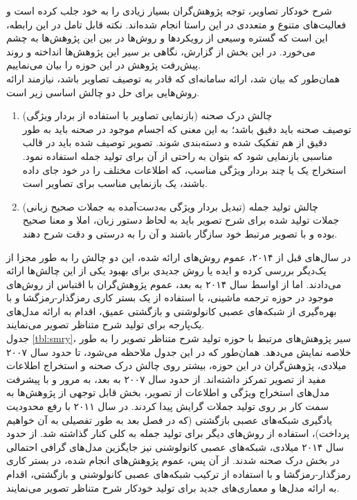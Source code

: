 شرح خودکار تصاویر، توجه پژوهش‌گران بسیار زیادی را به خود جلب کرده است و فعالیت‌های متنوع و متعددی در این راستا انجام شده‌اند. نکته قابل تامل در این رابطه، این است که گستره وسیعی از رویکردها و روش‌ها در بین این پژوهش‌ها به چشم می‌خورد. در این بخش از گزارش، نگاهی بر سیر این پژوهش‌ها انداخته و روند پیش‌رفت پژوهش‌ در این حوزه را بیان می‌نماییم.
\\
همان‌طور که بیان شد، ارائه سامانه‌ای که قادر به توصیف تصاویر باشد، نیازمند ارائه روش‌هایی برای حل دو چالش اساسی زیر است.
\begin{enumerate}
	\item چالش درک صحنه 
	(بازنمایی تصاویر با استفاده از بردار ویژگی) \\
	توصیف صحنه باید دقیق باشد؛ به این معنی که اجسام موجود در صحنه باید به طور دقیق از هم تفکیک شده و دسته‌بندی شوند. تصویر توصیف شده باید در قالب مناسبی بازنمایی شود که بتوان به راحتی از آن برای تولید جمله استفاده نمود. استخراج یک یا چند بردار ویژگی مناسب، که اطلاعات مختلف را در خود جای داده‌ باشند، یک بازنمایی مناسب برای تصاویر است.
	\item چالش تولید جمله
	(تبدیل بردار ويژگی به‌دست‌آمده به جملات صحیح زبانی)
	\\
	جملات تولید شده برای شرح تصویر باید به لحاظ دستور زبان، املا و معنا صحیح بوده و با تصویر مرتبط خود سازگار باشند و آن را به درستی و دقت شرح دهند.
\end{enumerate}

در سال‌های قبل از ۲۰۱۴، عموم روش‌های ارائه شده، این دو چالش را به طور مجزا از یک‌دیگر بررسی کرده و ایده یا روش جدیدی برای بهبود یکی از این چالش‌ها ارائه می‌دادند. اما از اواسط سال ۲۰۱۴ به بعد، عموم پژوهش‌گران با اقتباس از روش‌های موجود در حوزه ترجمه ماشینی، با استفاده از یک بستر کاری رمزگذار-رمزگشا و با بهره‌گیری از شبکه‌های عصبی کانولوشنی و بازگشتی عمیق، اقدام به ارائه مدل‌های یک‌پارجه برای تولید شرح متناظر تصویر می‌نمایند.
\\
جدول \ref{tbl:smry}، سیر پژوهش‌های مرتبط با حوزه تولید شرح متناظر تصویر را به طور خلاصه نمایش می‌دهد. همان‌طور که در این جدول ملاحظه می‌شود، تا حدود سال ۲۰۰۷ میلادی، پژوهش‌گران در این حوزه، بیشتر روی چالش درک صحنه و استخراج اطلاعات مفید از تصویر تمرکز داشته‌اند. از حدود سال ۲۰۰۷ به بعد، به مرور و با پیشرفت مدل‌های استخراج ویژگی و اطلاعات از تصویر، بخش قابل توجهی از پژوهش‌ها به سمت کار بر روی تولید جملات گرایش پیدا کردند. در سال ۲۰۱۱ با رفع محدودیت یادگیری شبکه‌های عصبی بازگشتی (که در فصل بعد به طور تفصیلی به آن خواهیم پرداخت)، استفاده از روش‌های دیگر برای تولید جمله به کلی کنار گذاشته شد. از حدود سال ۲۰۱۴ میلادی، شبکه‌های عصبی کانولوشنی نیز جایگزین مدل‌های گرافی احتمالی در بخش درک صحنه شدند. از آن پس، عموم پژوهش‌های انجام‌ شده، در بستر کاری رمزگذار-رمزگشا و با استفاده از ترکیب شبکه‌های عصبی کانولوشنی و بازگشتی، اقدام به ارائه مدل‌ها و معماری‌های جدید برای تولید خودکار شرح متناظر تصویر می‌نمایند.

